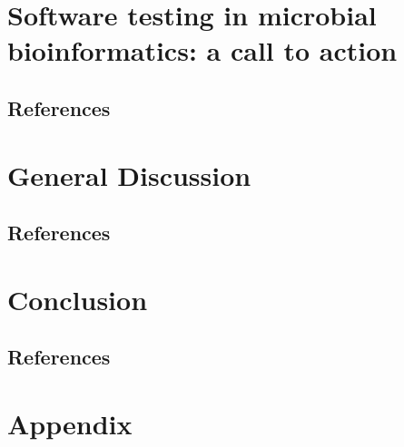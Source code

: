 \documentclass[12pt,a4paper,twoside,openright]{book}
\begin{document}
\begin{sloppy}
\chapter{Software testing in microbial bioinformatics: a call to action\label{ch:paper7}}

\thispagestyle{empty}
\clearpage \thispagestyle{empty}\mbox{}\clearpage
\newpage
\begin{refsection}

\newpage
\section{References}
\printbibliography[heading=none]
\end{refsection}



\newpage
\thispagestyle{empty}
\chapter{General Discussion \label{ch:discussion}}

\clearpage \thispagestyle{empty}\mbox{}\clearpage
\begin{refsection}

\newpage
\section{References}
\printbibliography[heading=none]
\end{refsection}

\newpage
\chapter{Conclusion \label{ch:conclusion}}

\clearpage \thispagestyle{empty}\mbox{}\clearpage
\begin{conclusion}

\newpage
\section{References}
\printbibliography[heading=none]
\end{conclusion}

\newpage
\chapter{Appendix}







\end{sloppy}
\end{document}
